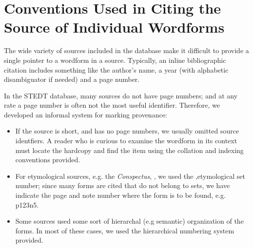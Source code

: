 \section*{Conventions Used in Citing the Source of Individual Wordforms}
\begin{multicols}{2}
The wide variety of sources included in the database make it difficult to provide a single pointer to a wordform in a source.
Typically, an inline bibliographic citation includes something like the author's name, a year (with alphabetic disambiguator if needed)
and a page number.

In the STEDT database, many sources do not have page numbers; and at any rate a page number is often not the most useful identifier.
Therefore, we developed an informal system for marking provenance:

\begin{itemize}
\item If the source is short, and has no page numbers, we usually omitted source identfiers. A reader who is curious to examine 
the wordform in its context must locate the hardcopy and find the item using the collation and indexing conventions provided.
\item For etymological sources, e.g. the \textit{Conspectus}, \citealt{STC}, we used the ,etymological set number; since many forms are cited that do not 
belong to sets, we have indicate the page and note number where the form is to be found, e.g. p123n5.
\item Some sources used some sort of hierarchal (e.g semantic) organization of the forms. In most of these cases, we used the
hierarchical numbering system provided.
\end{itemize}

\end{multicols}


